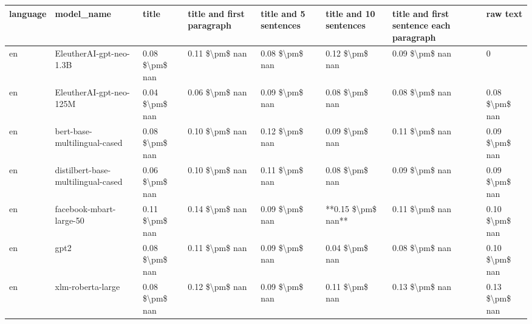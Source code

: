 \begin{tabular}{llllllll}
\toprule
language &                         model\_name &          title & title and first paragraph & title and 5 sentences & title and 10 sentences & title and first sentence each paragraph &           raw text \\
\midrule
      en &            EleutherAI-gpt-neo-1.3B & 0.08 \$\textbackslash pm\$ nan &            0.11 \$\textbackslash pm\$ nan &        0.08 \$\textbackslash pm\$ nan &         0.12 \$\textbackslash pm\$ nan &                          0.09 \$\textbackslash pm\$ nan &                  0 \\
      en &            EleutherAI-gpt-neo-125M & 0.04 \$\textbackslash pm\$ nan &            0.06 \$\textbackslash pm\$ nan &        0.09 \$\textbackslash pm\$ nan &         0.08 \$\textbackslash pm\$ nan &                          0.08 \$\textbackslash pm\$ nan &     0.08 \$\textbackslash pm\$ nan \\
      en &       bert-base-multilingual-cased & 0.08 \$\textbackslash pm\$ nan &            0.10 \$\textbackslash pm\$ nan &        0.12 \$\textbackslash pm\$ nan &         0.09 \$\textbackslash pm\$ nan &                          0.11 \$\textbackslash pm\$ nan &     0.09 \$\textbackslash pm\$ nan \\
      en & distilbert-base-multilingual-cased & 0.06 \$\textbackslash pm\$ nan &            0.10 \$\textbackslash pm\$ nan &        0.11 \$\textbackslash pm\$ nan &         0.08 \$\textbackslash pm\$ nan &                          0.09 \$\textbackslash pm\$ nan &     0.09 \$\textbackslash pm\$ nan \\
      en &            facebook-mbart-large-50 & 0.11 \$\textbackslash pm\$ nan &            0.14 \$\textbackslash pm\$ nan &        0.09 \$\textbackslash pm\$ nan &     **0.15 \$\textbackslash pm\$ nan** &                          0.11 \$\textbackslash pm\$ nan &     0.10 \$\textbackslash pm\$ nan \\
      en &                               gpt2 & 0.08 \$\textbackslash pm\$ nan &            0.11 \$\textbackslash pm\$ nan &        0.09 \$\textbackslash pm\$ nan &         0.04 \$\textbackslash pm\$ nan &                          0.08 \$\textbackslash pm\$ nan &     0.10 \$\textbackslash pm\$ nan \\
      en &                  xlm-roberta-large & 0.08 \$\textbackslash pm\$ nan &            0.12 \$\textbackslash pm\$ nan &        0.09 \$\textbackslash pm\$ nan &         0.11 \$\textbackslash pm\$ nan &                          0.13 \$\textbackslash pm\$ nan &     0.13 \$\textbackslash pm\$ nan \\

\end{tabular}
